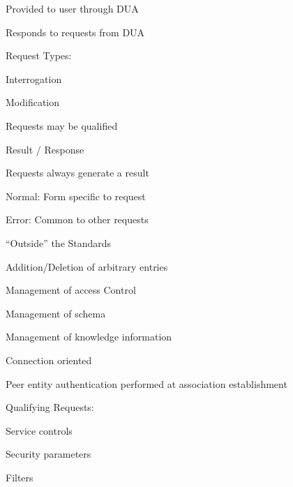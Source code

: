 \begin{bwslide}
\begin{nrtc}
\item	Provided to user through DUA
\item	Responds to requests from DUA
\item	Request Types:
	\begin{nrtc}
	\item	Interrogation
	\item	Modification
	\end{nrtc}
\item	Requests may be qualified
\item	Result / Response
	\begin{nrtc}
	\item	Requests always generate a result
	\item	Normal: Form specific to request
	\item	Error: Common to other requests
	\end{nrtc}
\end{nrtc}
\end{bwslide}

\begin{bwslide}
\begin{nrtc}
\item	``Outside'' the Standards
	\begin{nrtc}
	\item Addition/Deletion of arbitrary entries
	\item Management of access Control
	\item Management of schema
	\item Management of knowledge information
	\end{nrtc}
\end{nrtc}
\end{bwslide}

\begin{bwslide}

\begin{nrtc}
\item	Connection oriented
\item	Peer entity authentication performed at association establishment
\end{nrtc}
\end{bwslide}

\begin{bwslide}
Qualifying Requests:
\begin{nrtc}
\item	Service controls
\item	Security parameters
\item	Filters
\end{nrtc}
\end{bwslide}

